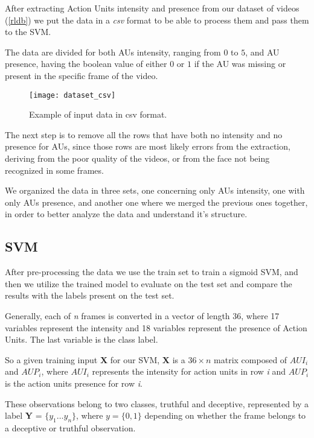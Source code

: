 After extracting Action Units intensity and presence from our dataset of videos (\ref{rldb}) we put the data in a \textit{csv} format to be able to process them and pass them to the SVM. 

The data are divided for both AUs intensity, ranging from $0$ to $5$, and AU presence, having the boolean value of either $0$ or $1$ if the AU was missing or present in the specific frame of the video.

\begin{figure}[H]
	\centering
	\texttt{[image: dataset\_csv]}
	\caption{Example of input data in csv format.}
	\label{fig:dataset_csv}
\end{figure}

The next step is to remove all the rows that have both no intensity and no presence for AUs, since those rows are most likely errors from the extraction, deriving from the poor quality of the videos, or from the face not being recognized in some frames.

We organized the data in three sets, one concerning only AUs intensity, one with only AUs presence, and another one where we merged the previous ones together, in order to better analyze the data and understand it's structure.

\subsection{SVM}

After pre-processing the data we use the train set to train a sigmoid %
SVM, and then we utilize the trained model to evaluate on the test set and compare the results with the labels present on the test set.

Generally, each of \textit{n} frames is converted in a vector of length 36, where 17 variables represent the intensity and 18 variables represent the presence of Action Units. The last variable is the class label.

So a given training input \textbf{X} for our SVM, \textbf{X} is a $36 \times n$ matrix composed of $AUI_i$ and $AUP_i$, where $AUI_i$ represents the intensity for action units in row \textit{i} and $AUP_i$ is the action units presence for row \textit{i}. 

These observations belong to two classes, truthful and deceptive, represented by a label \textbf{Y} = $\{y_1 \dots y_n\}$, where $y = \{0,1\}$ depending on whether the frame belongs to a deceptive or truthful observation.

